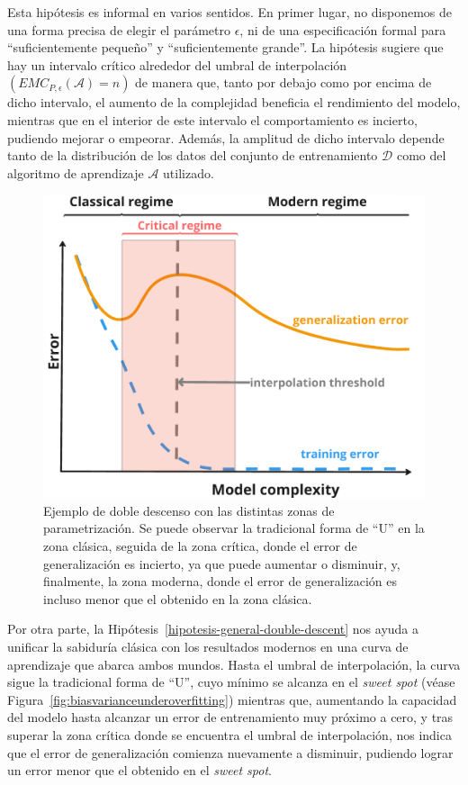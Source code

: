 Esta hipótesis es informal en varios sentidos. En primer lugar, no disponemos de una forma precisa de elegir el parámetro $\epsilon$, ni de una especificación formal para ``suficientemente pequeño'' y ``suficientemente grande''. La hipótesis sugiere que hay un intervalo crítico alrededor del umbral de interpolación $(EMC_{P, \epsilon}(\mathcal{A}) = n)$ de manera que, tanto por debajo como por encima de dicho intervalo, el aumento de la complejidad beneficia el rendimiento del modelo, mientras que en el interior de este intervalo el comportamiento es incierto, pudiendo mejorar o empeorar. Además, la amplitud de dicho intervalo depende tanto de la distribución de los datos del conjunto de entrenamiento $\mathcal{D}$ como del algoritmo de aprendizaje $\mathcal{A}$ utilizado.

\begin{figure}[h]
    \centering
    \includegraphics[width=0.6\linewidth]{img/planteamiento-teorico-dd.png}
    \caption[Ejemplo de doble descenso con las distintas zonas de parametrización.]{Ejemplo de doble descenso con las distintas zonas de parametrización. Se puede observar la tradicional forma de ``U'' en la zona clásica, seguida de la zona crítica, donde el error de generalización es incierto, ya que puede aumentar o disminuir, y, finalmente, la zona moderna, donde el error de generalización es incluso menor que el obtenido en la zona clásica.}\label{fig:planteamiento-teorico-dd.png}
\end{figure}

Por otra parte, la Hipótesis~\ref{hipotesis-general-double-descent} nos ayuda a unificar la sabiduría clásica con los resultados modernos en una curva de aprendizaje que abarca ambos mundos. Hasta el umbral de interpolación, la curva sigue la tradicional forma de ``U'', cuyo mínimo se alcanza en el \textit{sweet spot} (véase Figura~\ref{fig:biasvarianceunderoverfitting}) mientras que, aumentando la capacidad del modelo hasta alcanzar un error de entrenamiento muy próximo a cero, y tras superar la zona crítica donde se encuentra el umbral de interpolación, nos indica que el error de generalización comienza nuevamente a disminuir, pudiendo lograr un error menor que el obtenido en el \textit{sweet spot}.

